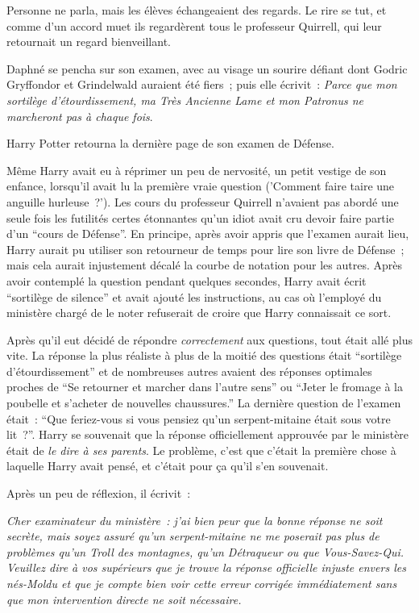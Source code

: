 Personne ne parla, mais les élèves échangeaient des regards.
Le rire se tut, et comme d'un accord muet ils regardèrent tous le professeur Quirrell, qui leur retournait un regard bienveillant.

Daphné se pencha sur son examen, avec au visage un sourire défiant dont Godric Gryffondor et Grindelwald auraient été fiers~; puis elle écrivit~: \emph{Parce que mon sortilège d'étourdissement, ma Très Ancienne Lame et mon Patronus ne marcheront pas à chaque fois}.

\later

Harry Potter retourna la dernière page de son examen de Défense.

Même Harry avait eu à réprimer un peu de nervosité, un petit vestige de son enfance, lorsqu'il avait lu la première vraie question ('Comment faire taire une anguille hurleuse~?').
Les cours du professeur Quirrell n'avaient pas abordé une seule fois les futilités certes étonnantes qu'un idiot avait cru devoir faire partie d'un “cours de Défense”.
En principe, après avoir appris que l'examen aurait lieu, Harry aurait pu utiliser son retourneur de temps pour lire son livre de Défense~; mais cela aurait injustement décalé la courbe de notation pour les autres.
Après avoir contemplé la question pendant quelques secondes, Harry avait écrit “sortilège de silence” et avait ajouté les instructions, au cas où l'employé du ministère chargé de le noter refuserait de croire que Harry connaissait ce sort.

Après qu'il eut décidé de répondre \emph{correctement} aux questions, tout était allé plus vite.
La réponse la plus réaliste à plus de la moitié des questions était “sortilège d'étourdissement” et de nombreuses autres avaient des réponses optimales proches de “Se retourner et marcher dans l'autre sens” ou “Jeter le fromage à la poubelle et s'acheter de nouvelles chaussures.”
La dernière question de l'examen était~: “Que feriez-vous si vous pensiez qu'un serpent-mitaine était sous votre lit~?”.
Harry se souvenait que la réponse officiellement approuvée par le ministère était de \emph{le dire à ses parents}.
Le problème, c'est que c'était la première chose à laquelle Harry avait pensé, et c'était pour ça qu'il s'en souvenait.

Après un peu de réflexion, il écrivit~:

\emph{Cher examinateur du ministère~: j'ai bien peur que la bonne réponse ne soit secrète, mais soyez assuré qu'un serpent-mitaine ne me poserait pas plus de problèmes qu'un Troll des montagnes, qu'un Détraqueur ou que Vous-Savez-Qui.
Veuillez dire à vos supérieurs que je trouve la réponse officielle injuste envers les nés-Moldu et que je compte bien voir cette erreur corrigée immédiatement sans que mon intervention directe ne soit nécessaire.}

